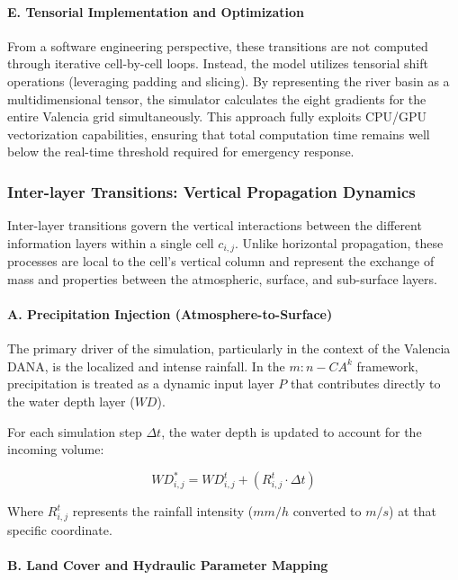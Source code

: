 \paragraph{E. Tensorial Implementation and Optimization}

From a software engineering perspective, these transitions are not computed through iterative cell-by-cell loops. Instead, the model 
utilizes tensorial shift operations (leveraging padding and slicing). By representing the river basin as a multidimensional tensor, 
the simulator calculates the eight gradients for the entire Valencia grid simultaneously. This approach fully exploits CPU/GPU 
vectorization capabilities, ensuring that total computation time remains well below the real-time threshold required for emergency 
response.


\subsubsection{Inter-layer Transitions: Vertical Propagation Dynamics}

Inter-layer transitions govern the vertical interactions between the different information layers within a single cell $c_{i,j}$. 
Unlike horizontal propagation, these processes are local to the cell's vertical column and represent the exchange of mass and 
properties between the atmospheric, surface, and sub-surface layers.

\paragraph{A. Precipitation Injection (Atmosphere-to-Surface)}

The primary driver of the simulation, particularly in the context of the Valencia DANA, is the localized and intense rainfall. In the 
$m:n-CA^k$ framework, precipitation is treated as a dynamic input layer $P$ that contributes directly to the water depth layer ($WD$).

For each simulation step $\Delta t$, the water depth is updated to account for the incoming volume:

$$WD_{i,j}^{*} = WD_{i,j}^{t} + \left( R_{i,j}^{t} \cdot \Delta t \right)$$

Where $R_{i,j}^{t}$ represents the rainfall intensity ($mm/h$ converted to $m/s$) at that specific coordinate.

\paragraph{B. Land Cover and Hydraulic Parameter Mapping}

